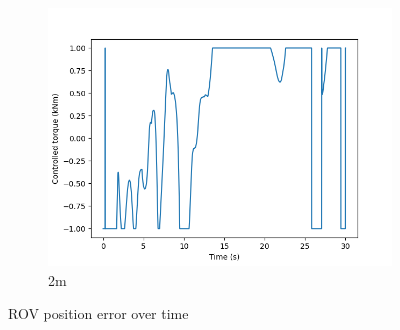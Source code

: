 \documentclass[class=article, crop=false]{standalone}
\begin{document}
\begin{figure}
\begin{subfigure}[b]{0.48\textwidth}
        \includegraphics{scenario1/rov-0m/2.0m/usv_torque}
        \caption{2m}
        \label{}
    \end{subfigure}

    \caption{ROV position error over time}
\end{figure}
\end{document}
